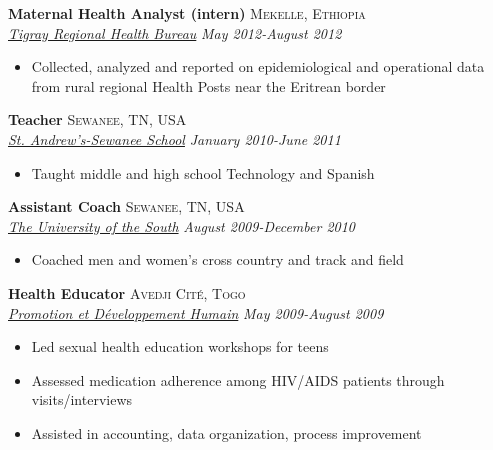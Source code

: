 \documentclass[11pt]{article}
\begin{document}
{\noindent \textbf{Maternal Health Analyst (intern)} \hfill \textsc{Mekelle, Ethiopia}\\
\noindent \emph{\href{http://www.moh.gov.et/tigrayhb}{Tigray Regional Health Bureau}} \hfill \emph{May 2012-August 2012}
\vspace{-2mm}
\begin{itemize}\itemsep0pt \parskip0pt 
\item Collected, analyzed and reported on epidemiological and operational data from rural regional Health Posts near the Eritrean border
\end{itemize}

\noindent \textbf{Teacher} \hfill \textsc{Sewanee, TN, USA}\\
\noindent \emph{\href{http://www.sasweb.org/}{St. Andrew's-Sewanee School}} \hfill \emph{January 2010-June 2011}
\vspace{-2mm}
\begin{itemize}\itemsep0pt \parskip0pt 
\item Taught middle and high school Technology and Spanish
\end{itemize}

\noindent \textbf{Assistant Coach} \hfill \textsc{Sewanee, TN, USA}\\
\noindent \emph{\href{http://sewanee.edu/}{The University of the South}} \hfill \emph{August 2009-December 2010}
\vspace{-2mm}
\begin{itemize}\itemsep0pt \parskip0pt 
\item Coached men and women's cross country and track and field
\end{itemize}

\noindent \textbf{Health Educator} \hfill \textsc{Avedji Cité, Togo}\\
\noindent \emph{\href{http://www.pdh-togo.org/html/english/welcome.html}{Promotion et Développement Humain}} \hfill \emph{May 2009-August 2009}
\vspace{-2mm}
\begin{itemize}\itemsep0pt \parskip0pt 
\item Led sexual health education workshops for teens
\item Assessed medication adherence among HIV/AIDS patients through visits/interviews
\item Assisted in accounting, data organization, process improvement

\end{itemize}

}
\end{document}
